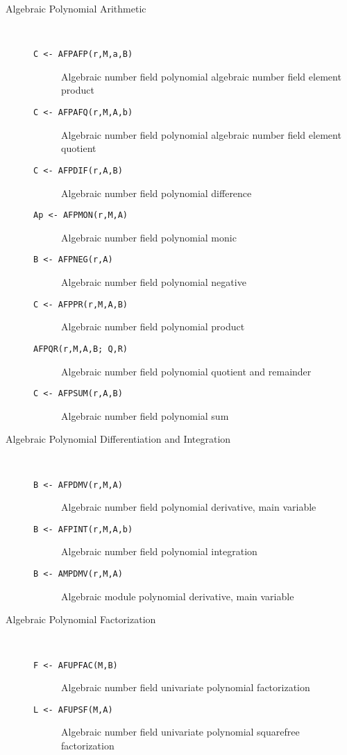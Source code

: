 \begin{description}
\item[Algebraic Polynomial Arithmetic] \ \
\begin{description}
  \item[{\tt C <- AFPAFP(r,M,a,B) 
}] Algebraic number field polynomial algebraic number 
              field element product
  \item[{\tt C <- AFPAFQ(r,M,A,b) 
}] Algebraic number field polynomial algebraic number field 
              element quotient
  \item[{\tt C <- AFPDIF(r,A,B) 
}] Algebraic number field polynomial difference
  \item[{\tt Ap <- AFPMON(r,M,A) 
}] Algebraic number field polynomial monic
  \item[{\tt B <- AFPNEG(r,A) 
}] Algebraic number field polynomial negative
  \item[{\tt C <- AFPPR(r,M,A,B) 
}] Algebraic number field polynomial product
  \item[{\tt  AFPQR(r,M,A,B; Q,R) 
}] Algebraic number field polynomial quotient and remainder
  \item[{\tt C <- AFPSUM(r,A,B) 
}] Algebraic number field polynomial sum
\end{description}

\item[Algebraic Polynomial Differentiation and Integration] \ \
\begin{description}
  \item[{\tt B <- AFPDMV(r,M,A) 
}] Algebraic number field polynomial derivative, main variable
  \item[{\tt B <- AFPINT(r,M,A,b) 
}]\index{AFPINT} Algebraic number field polynomial integration
  \item[{\tt B <- AMPDMV(r,M,A) 
}]\index{AFPDMV} Algebraic module polynomial derivative, main variable
\end{description}

\item[Algebraic Polynomial Factorization] \ \
\begin{description}
  \item[{\tt F <- AFUPFAC(M,B) 
}]\index{AFUPFAC} Algebraic number field univariate polynomial factorization 
  \item[{\tt L <- AFUPSF(M,A) 
}]\index{AFUPSF} Algebraic number field univariate polynomial squarefree 
              factorization
\end{description}


\end{description}
